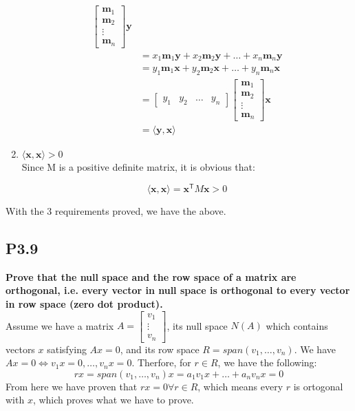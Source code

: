 \documentclass[12pt]{article}
\begin{document}
\begin{enumerate}
\begin{align*}
\begin{bmatrix}
\mathbf m_1\\
\mathbf m_2\\
\vdots\\
\mathbf m_n
\end{bmatrix}
\mathbf y\\
&= x_1\mathbf m_1 \mathbf y + x_2\mathbf m_2 \mathbf y + \ldots + x_n \mathbf m_n \mathbf y\\
&= y_1\mathbf m_1 \mathbf x + y_2\mathbf m_2 \mathbf x + \ldots + y_n \mathbf m_n \mathbf x\\
&= \begin{bmatrix}
y_1 &
y_2 &
\ldots &
y_n
\end{bmatrix}\begin{bmatrix}
\mathbf m_1\\
\mathbf m_2\\
\vdots\\
\mathbf m_n
\end{bmatrix}
\mathbf x\\
&= \langle \mathbf y,\mathbf x\rangle 
\end{align*}
\item $\langle \mathbf x,\mathbf x \rangle > 0 $\\
Since M is a positive definite matrix, it is obvious that:

$$\langle \mathbf x,\mathbf x \rangle = \mathbf x^\mathsf{T}M\mathbf x >0$$

\end{enumerate}
With the 3 requirements proved, we have the above.


\subsection*{P3.9}
\textbf{Prove that the null space and the row space of a matrix are orthogonal, i.e. every vector in null space is orthogonal to every vector in row space (zero dot product).}\\
Assume we have a matrix $A = \begin{bmatrix}
v_1\\
\vdots\\
v_n
\end{bmatrix}$, its null space $N(A)$ which contains vectors $x$ satisfying $Ax=0$, and its row space $R = span(v_1,\ldots,v_n)$. We have $Ax = 0 \Leftrightarrow v_1x=0, \ldots, v_nx=0$. Therfore, for $r \in R$, we have the following: $$rx = span(v_1,\ldots,v_n)x = a_1v_1x + \ldots+ a_nv_nx = 0$$
From here we have proven that $rx=0 \forall r \in R$, which means every $r$ is ortogonal with $x$, which proves what we have to prove.
\end{document}
